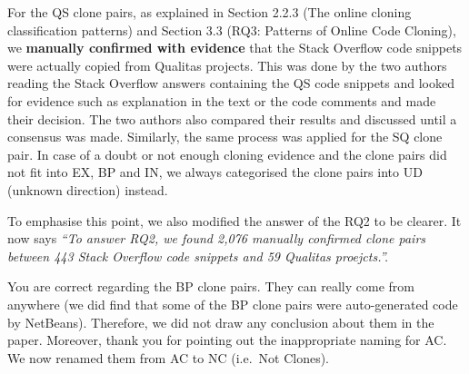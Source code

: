 \documentclass[a4paper,twoside,10pt]{reviewresponse}
\begin{document}
For the QS clone pairs, as explained in Section 2.2.3 (The online cloning
classification patterns) and Section 3.3 (RQ3: Patterns of Online Code Cloning),
we \textbf{manually confirmed with evidence} that the Stack Overflow code
snippets were actually copied from Qualitas projects. This was done by the two
authors reading the Stack Overflow answers containing the QS code snippets and
looked for evidence such as explanation in the text or the code comments and
made their decision. The two authors also compared their results and discussed
until a consensus was made. Similarly, the same process was applied for the SQ
clone pair. %
In case of a doubt or not enough cloning evidence and the clone pairs did not
fit into EX, BP and IN, we always categorised the clone pairs into UD (unknown
direction) instead.

To emphasise this point, we also modified the answer of the RQ2 to be clearer.
It now says \textit{``To answer RQ2, we found 2,076 manually confirmed clone
	pairs between 443 Stack Overflow code snippets and 59 Qualitas proejcts.''.}


You are correct regarding the BP clone pairs. They can really come from anywhere
(we did find that some of the BP clone pairs were auto-generated code by
NetBeans). Therefore, we did not draw any conclusion about them in the paper.
Moreover, thank you for pointing out the inappropriate naming for AC. We now
renamed them from AC to NC (i.e.~Not Clones).
\end{document}
